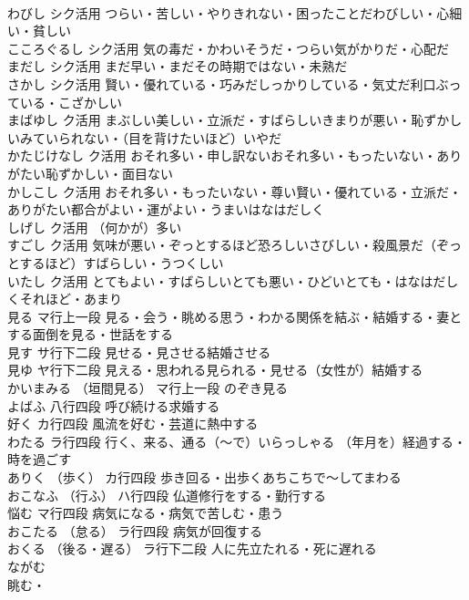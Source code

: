 \documentclass[8pt]{extreport}
\begin{document}
\begin{CJK}{UTF8}{min}
\\	わびし		シク活用	つらい・苦しい・やりきれない・困ったことだわびしい・心細い・貧しい
\\	こころぐるし		シク活用	気の毒だ・かわいそうだ・つらい気がかりだ・心配だ
\\	まだし		シク活用	まだ早い・まだその時期ではない・未熟だ
\\	さかし		シク活用	賢い・優れている・巧みだしっかりしている・気丈だ利口ぶっている・こざかしい
\\	まばゆし		ク活用	まぶしい美しい・立派だ・すばらしいきまりが悪い・恥ずかしいみていられない・（目を背けたいほど）いやだ
\\	かたじけなし		ク活用	おそれ多い・申し訳ないおそれ多い・もったいない・ありがたい恥ずかしい・面目ない
\\	かしこし		ク活用	おそれ多い・もったいない・尊い賢い・優れている・立派だ・ありがたい都合がよい・運がよい・うまいはなはだしく
\\	しげし		ク活用	（何かが）多い
\\	すごし		ク活用	気味が悪い・ぞっとするほど恐ろしいさびしい・殺風景だ（ぞっとするほど）すばらしい・うつくしい
\\	いたし		ク活用	とてもよい・すばらしいとても悪い・ひどいとても・はなはだしくそれほど・あまり
\\	見る		マ行上一段	見る・会う・眺める思う・わかる関係を結ぶ・結婚する・妻とする面倒を見る・世話をする
\\	見す		サ行下二段	見せる・見させる結婚させる
\\	見ゆ		ヤ行下二段	見える・思われる見られる・見せる（女性が）結婚する
\\	かいまみる	（垣間見る）	マ行上一段	のぞき見る
\\	よばふ		八行四段	呼び続ける求婚する
\\	好く		カ行四段	風流を好む・芸道に熱中する
\\	わたる		ラ行四段	行く、来る、通る（～で）いらっしゃる （年月を）経過する・時を過ごす
\\	ありく	（歩く）	カ行四段	歩き回る・出歩くあちこちで～してまわる
\\	おこなふ	（行ふ）	ハ行四段	仏道修行をする・勤行する
\\	悩む		マ行四段	病気になる・病気で苦しむ・患う
\\	おこたる	（怠る）	ラ行四段	病気が回復する
\\	おくる	（後る・遅る）	ラ行下二段	人に先立たれる・死に遅れる
\\	ながむ	
\\	眺む・

\end{CJK}
\end{document}

